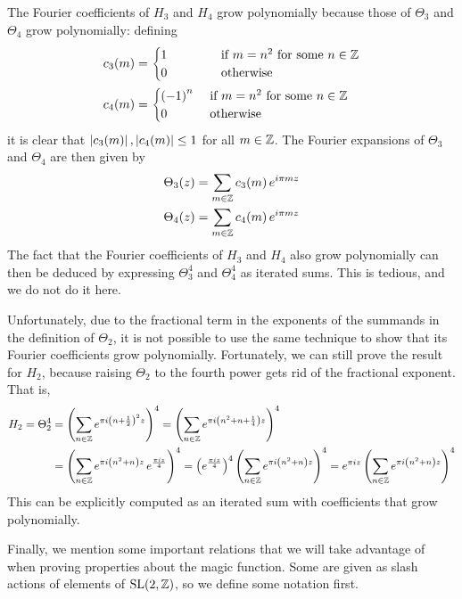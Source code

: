 The Fourier coefficients of $H_3$ and $H_4$ grow polynomially because those of $\Theta_3$ and $\Theta_4$ grow polynomially: defining
\begin{align*}
    c_3(m) &=
    \begin{cases}
        1 \quad\quad\quad & \text{ if } m = n^2 \text{ for some } n \in \mathbb{Z} \\
        0 \quad\quad\quad & \text{ otherwise}
    \end{cases} \\
    c_4(m) &=
    \begin{cases}
        \left( -1 \right)^n & \text{ if } m = n^2 \text{ for some } n \in \mathbb{Z} \\
        0 & \text{ otherwise}
    \end{cases}
\end{align*}
it is clear that $\left\lvert c_3(m) \right\rvert, \left\lvert c_4(m) \right\rvert \leq 1$ for all $m \in \mathbb{Z}$. The Fourier expansions of $\Theta_3$ and $\Theta_4$ are then given by
\begin{align*}
    \Theta_{3}\!\left( z \right) &= \sum_{m \in \mathbb{Z}} c_3(m) \, e^{i\pi m z} \\
    \Theta_{4}\!\left( z \right) &= \sum_{m \in \mathbb{Z}} c_4(m) \, e^{i\pi m z}
\end{align*}
The fact that the Fourier coefficients of $H_3$ and $H_4$ also grow polynomially can then be deduced by expressing $\Theta_3^4$ and $\Theta_4^4$ as iterated sums. This is tedious, and we do not do it here.

Unfortunately, due to the fractional term in the exponents of the summands in the definition of $\Theta_2$, it is not possible to use the same technique to show that its Fourier coefficients grow polynomially. Fortunately, we can still prove the result for $H_2$, because raising $\Theta_2$ to the fourth power gets rid of the fractional exponent. That is,
\begin{align*}
    H_2 = \Theta_2^4
    &= \left( \sum_{n \in \mathbb{Z}} e^{\pi i \left( n + \frac{1}{2} \right)^2 z} \right)^4
    = \left( \sum_{n \in \mathbb{Z}} e^{\pi i \left( n^2 + n + \frac{1}{4} \right) z} \right)^4 \\
    &= \left( \sum_{n \in \mathbb{Z}} e^{\pi i \left( n^2 + n \right) z} \, e^{\frac{\pi i z}{4}} \right)^4
    = \left( e^{\frac{\pi i z}{4}} \right)^4  \left( \sum_{n \in \mathbb{Z}} e^{\pi i \left( n^2 + n \right) z} \right)^4
    = e^{\pi i z} \left( \sum_{n \in \mathbb{Z}} e^{\pi i \left( n^2 + n \right) z} \right)^4
\end{align*}
This can be explicitly computed as an iterated sum with coefficients that grow polynomially.

Finally, we mention some important relations that we will take advantage of when proving properties about the magic function. Some are given as slash actions of elements of $\operatorname{SL}\!\left( 2, \mathbb{Z} \right)$, so we define some notation first.

